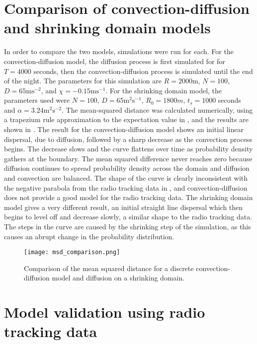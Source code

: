
\section{Comparison of convection-diffusion and shrinking domain models}

In order to compare the two models, simulations were run for each. For the convection-diffusion model, the diffusion process is first simulated for for $T = 4000$ seconds, then the convection-diffusion process is simulated until the end of the night. The parameters for this simulation are $R = 2000$m, $N = 100$,
$D = 65\mathrm{ms^{-2}}$, and $\chi =  - 0.15\mathrm{ms^{-1}}$. For the shrinking domain model, the parameters used were $N = 100$, $D = 65\mathrm{m^2s^{-1}}$, $R_0 = 1800m$, $t_s = 1000$ seconds and $\alpha  = 3.24 \mathrm{m^2s^{-2}}$. The mean-squared distance was calculated numerically, using a trapezium rule
approximation to the expectation value in , and the results are shown in . The result for the convection-diffusion model shows an initial linear dispersal, due to diffusion, followed by a sharp decrease as the convection process begins. The decrease slows and the curve flattens over time as probability density gathers at the boundary. The mean squared difference never reaches zero because diffusion continues to spread probability density across the domain and diffusion and convection are balanced. The shape of the curve is clearly inconsistent with the negative parabola from the radio tracking data in , and convection-diffusion does not provide a good model for the radio tracking data. The shrinking domain model gives a very different result, an initial straight line dispersal which then begins to level off and decrease slowly, a similar shape to the radio tracking data. The steps in the curve are caused by the shrinking step of the simulation, as this causes an abrupt change in the probability distribution.

\begin{figure} [h]
    \centering
        \texttt{[image: msd\_comparison.png]}
        \caption{Comparison of the mean squared distance for a discrete convection-diffusion model and diffusion on a shrinking domain.
        }
    \label{fig:c-d_shrink}
\end{figure}

\section{Model validation using radio tracking data}

